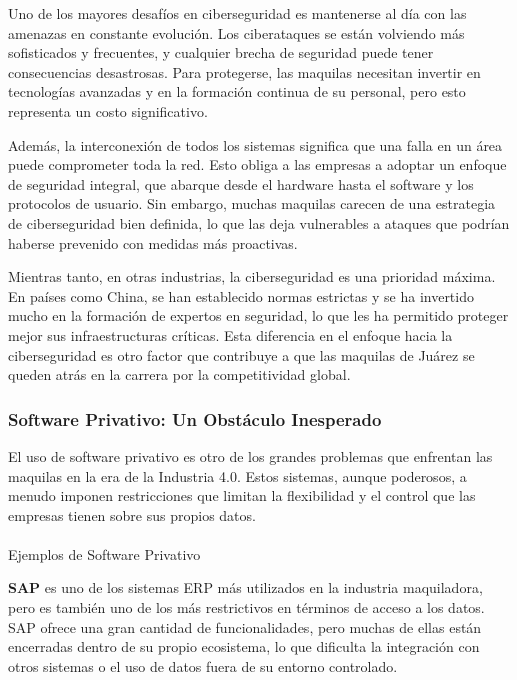 \documentclass[
  letterpaper,
]{book}
\makeatletter
\let\oldparagraph\paragraph
\renewcommand{\paragraph}{
    \@ifstar
      \xxxParagraphStar
      \xxxParagraphNoStar
  }
\newcommand{\xxxParagraphStar}[1]{\oldparagraph*{#1}\mbox{}}
\newcommand{\xxxParagraphNoStar}[1]{\oldparagraph{#1}\mbox{}}
\makeatother
\begin{document}
Uno de los mayores desafíos en ciberseguridad es mantenerse al día con
las amenazas en constante evolución. Los ciberataques se están volviendo
más sofisticados y frecuentes, y cualquier brecha de seguridad puede
tener consecuencias desastrosas. Para protegerse, las maquilas necesitan
invertir en tecnologías avanzadas y en la formación continua de su
personal, pero esto representa un costo significativo.

Además, la interconexión de todos los sistemas significa que una falla
en un área puede comprometer toda la red. Esto obliga a las empresas a
adoptar un enfoque de seguridad integral, que abarque desde el hardware
hasta el software y los protocolos de usuario. Sin embargo, muchas
maquilas carecen de una estrategia de ciberseguridad bien definida, lo
que las deja vulnerables a ataques que podrían haberse prevenido con
medidas más proactivas.

Mientras tanto, en otras industrias, la ciberseguridad es una prioridad
máxima. En países como China, se han establecido normas estrictas y se
ha invertido mucho en la formación de expertos en seguridad, lo que les
ha permitido proteger mejor sus infraestructuras críticas. Esta
diferencia en el enfoque hacia la ciberseguridad es otro factor que
contribuye a que las maquilas de Juárez se queden atrás en la carrera
por la competitividad global.

\subsubsection{Software Privativo: Un Obstáculo
Inesperado}\label{software-privativo-un-obstuxe1culo-inesperado}

El uso de software privativo es otro de los grandes problemas que
enfrentan las maquilas en la era de la Industria 4.0. Estos sistemas,
aunque poderosos, a menudo imponen restricciones que limitan la
flexibilidad y el control que las empresas tienen sobre sus propios
datos.

\paragraph{Ejemplos de Software
Privativo}\label{ejemplos-de-software-privativo}

\textbf{SAP} es uno de los sistemas ERP más utilizados en la industria
maquiladora, pero es también uno de los más restrictivos en términos de
acceso a los datos. SAP ofrece una gran cantidad de funcionalidades,
pero muchas de ellas están encerradas dentro de su propio ecosistema, lo
que dificulta la integración con otros sistemas o el uso de datos fuera
de su entorno controlado.
\end{document}
